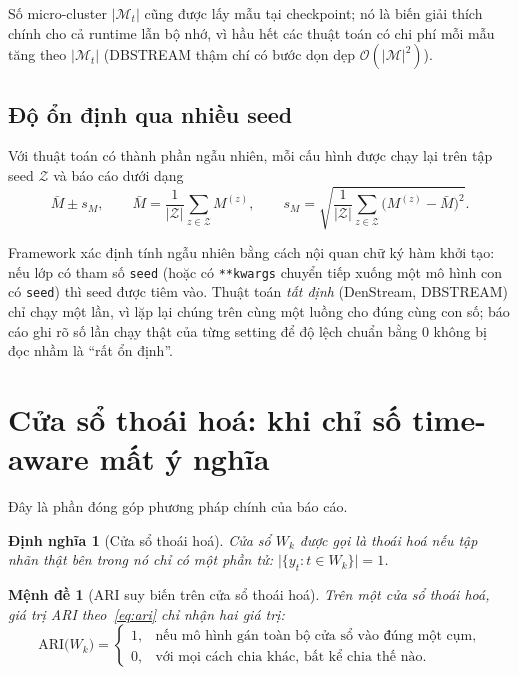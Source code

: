 \documentclass[11pt,a4paper]{article}
\newtheorem{proposition}{Mệnh đề}
\newtheorem{definition}{Định nghĩa}
\theoremstyle{remark}
\begin{document}
Số micro-cluster $|\mathcal{M}_t|$ cũng được lấy mẫu tại checkpoint; nó là biến
giải thích chính cho cả runtime lẫn bộ nhớ, vì hầu hết các thuật toán có chi phí
mỗi mẫu tăng theo $|\mathcal{M}_t|$ (DBSTREAM thậm chí có bước dọn dẹp
$\mathcal{O}(|\mathcal{M}|^2)$).

\subsection{Độ ổn định qua nhiều seed}

Với thuật toán có thành phần ngẫu nhiên, mỗi cấu hình được chạy lại trên tập
seed $\mathcal{Z}$ và báo cáo dưới dạng
\begin{equation}
  \bar{M} \pm s_M,
  \qquad
  \bar{M} = \frac{1}{|\mathcal{Z}|}\sum_{z\in\mathcal{Z}} M^{(z)},
  \qquad
  s_M = \sqrt{\frac{1}{|\mathcal{Z}|}\sum_{z\in\mathcal{Z}}\big(M^{(z)}-\bar M\big)^2}.
\end{equation}

Framework xác định tính ngẫu nhiên bằng cách nội quan chữ ký hàm khởi tạo: nếu
lớp có tham số \texttt{seed} (hoặc có \texttt{**kwargs} chuyển tiếp xuống một mô
hình con có \texttt{seed}) thì seed được tiêm vào. Thuật toán \emph{tất định}
(DenStream, DBSTREAM) chỉ chạy một lần, vì lặp lại chúng trên cùng một luồng cho
đúng cùng con số; báo cáo ghi rõ số lần chạy thật của từng setting để độ lệch
chuẩn bằng $0$ không bị đọc nhầm là ``rất ổn định''.

\section{Cửa sổ thoái hoá: khi chỉ số time-aware mất ý nghĩa}
\label{sec:degenerate}

Đây là phần đóng góp phương pháp chính của báo cáo.

\begin{definition}[Cửa sổ thoái hoá]
Cửa sổ $W_k$ được gọi là \emph{thoái hoá} nếu tập nhãn thật bên trong nó chỉ có
một phần tử: $\big|\{y_t : t \in W_k\}\big| = 1$.
\end{definition}

\begin{proposition}[ARI suy biến trên cửa sổ thoái hoá]
\label{prop:degenerate}
Trên một cửa sổ thoái hoá, giá trị ARI theo~\eqref{eq:ari} chỉ nhận hai giá trị:
\begin{equation}
  \mathrm{ARI}\big(W_k\big) =
  \begin{cases}
    1, & \text{nếu mô hình gán toàn bộ cửa sổ vào đúng một cụm},\\
    0, & \text{với mọi cách chia khác, bất kể chia thế nào}.
  \end{cases}
\end{equation}
\end{proposition}
\end{document}
